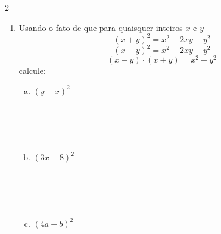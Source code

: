 \documentclass[a4paper,14pt]{article}
\begin{document}
\begin{multicols}{2}
\begin{enumerate}
\begin{enumerate}[a)]
    			\item $(x + 2)(x - 2)$ \\\\\\\\\\
    			\item $(5y - 8z)(5y + 8z)$ \\\\\\\\\\
    			\item $(m + 4n)(m - 4n)$ \\\\\\\\\\
    			\item $(7x + 3)^2$ \newpage
    			\item $(4t + 3s)^2$ \\\\\\\\\\
    		\end{enumerate}
    		\item Usando o fato de que para quaisquer inteiros $x$ e $y$
    		\begin{equation*}
    			(x + y)^2 = x^2 + 2xy + y^2
    		\end{equation*}
	    	\begin{equation*}
	    		(x - y)^2 = x^2 - 2xy + y^2
	    	\end{equation*}
		    \begin{equation*}
		    	(x - y) \cdot (x + y) = x^2 - y^2
		    \end{equation*}
    		calcule:
    		\begin{enumerate}[a)]
    			\item $(y - x)^2$ \\\\\\\\\\
    			\item $(3x - 8)^2$ \\\\\\\\\\
    			\item $(4a - b)^2$ \\\\\\\\\\

\end{enumerate}
\end{enumerate}
\end{multicols}
\end{document}
